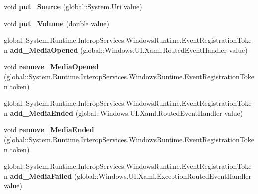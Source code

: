 \begin{DoxyCompactItemize}
void {\bfseries put\+\_\+\+Source} (global\+::\+System.\+Uri value)
\item 
\mbox{\label{interface_windows_1_1_u_i_1_1_xaml_1_1_controls_1_1_i_media_element_a499a56726198bd3a2e13da7fdaea8eb4}} 
void {\bfseries put\+\_\+\+Volume} (double value)
\item 
\mbox{\label{interface_windows_1_1_u_i_1_1_xaml_1_1_controls_1_1_i_media_element_af710ba32e5c086d5646e1a61e3a2bbaf}} 
global\+::\+System.\+Runtime.\+Interop\+Services.\+Windows\+Runtime.\+Event\+Registration\+Token {\bfseries add\+\_\+\+Media\+Opened} (global\+::\+Windows.\+U\+I.\+Xaml.\+Routed\+Event\+Handler value)
\item 
\mbox{\label{interface_windows_1_1_u_i_1_1_xaml_1_1_controls_1_1_i_media_element_ab974c092f3afe5c2c6eb21871e35d724}} 
void {\bfseries remove\+\_\+\+Media\+Opened} (global\+::\+System.\+Runtime.\+Interop\+Services.\+Windows\+Runtime.\+Event\+Registration\+Token token)
\item 
\mbox{\label{interface_windows_1_1_u_i_1_1_xaml_1_1_controls_1_1_i_media_element_a190c35f36005ac4360bc442c58c24107}} 
global\+::\+System.\+Runtime.\+Interop\+Services.\+Windows\+Runtime.\+Event\+Registration\+Token {\bfseries add\+\_\+\+Media\+Ended} (global\+::\+Windows.\+U\+I.\+Xaml.\+Routed\+Event\+Handler value)
\item 
\mbox{\label{interface_windows_1_1_u_i_1_1_xaml_1_1_controls_1_1_i_media_element_ae99093952bc4b7f856129d782cea9237}} 
void {\bfseries remove\+\_\+\+Media\+Ended} (global\+::\+System.\+Runtime.\+Interop\+Services.\+Windows\+Runtime.\+Event\+Registration\+Token token)
\item 
\mbox{\label{interface_windows_1_1_u_i_1_1_xaml_1_1_controls_1_1_i_media_element_ad3294027d9bad7858a991bb3a8b07ef8}} 
global\+::\+System.\+Runtime.\+Interop\+Services.\+Windows\+Runtime.\+Event\+Registration\+Token {\bfseries add\+\_\+\+Media\+Failed} (global\+::\+Windows.\+U\+I.\+Xaml.\+Exception\+Routed\+Event\+Handler value)

\end{DoxyCompactItemize}
